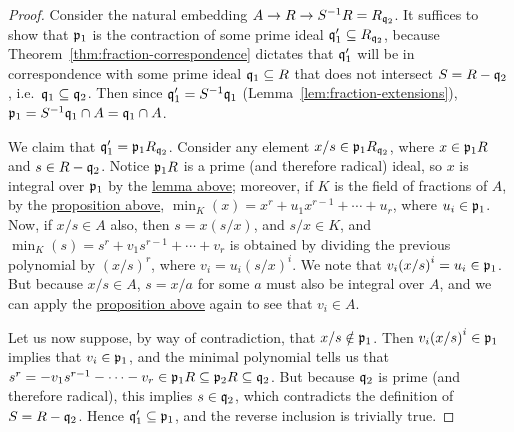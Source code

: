 \begin{proof}
    Consider the natural embedding \(A \to R \to S^{-1}R = R_{\mathfrak{q}_2}\).
    It suffices to show that \(\mathfrak{p}_1\)
    is the contraction of some prime ideal \(\mathfrak{q}_1' \subseteq R_{\mathfrak{q}_2}\),
    because Theorem~\ref{thm:fraction-correspondence} dictates that
    \(\mathfrak{q}_1'\) will be in correspondence with some prime ideal \(\mathfrak{q}_1 \subseteq R\)
    that does not intersect \(S = R - \mathfrak{q}_2\), i.e.\ \(\mathfrak{q}_1 \subseteq \mathfrak{q}_2\).
    Then since \(\mathfrak{q}_1' = S^{-1}\mathfrak{q}_1\) (Lemma~\ref{lem:fraction-extensions}),
    \(\mathfrak{p}_1 = S^{-1}\mathfrak{q}_1 \cap A = \mathfrak{q}_1 \cap A\).

    We claim that \(\mathfrak{q}_1' = \mathfrak{p}_1R_{\mathfrak{q}_2}\).
    Consider any element \(x/s \in \mathfrak{p}_1R_{\mathfrak{q}_2}\),
    where \(x \in \mathfrak{p}_1R\) and \(s \in R - \mathfrak{q}_2\).
    Notice \(\mathfrak{p}_1R\) is a prime (and therefore radical) ideal,
    so \(x\) is integral over \(\mathfrak{p}_1\) by the \hyperref[lem:ideal-integral-closure]{lemma above};
    moreover, if \(K\) is the field of fractions of \(A\),
    by the \hyperref[prop:integral-minimal-polynomial]{proposition above},
    \(\min_K(x) = x^r + u_1 x^{r-1} + \cdots + u_r\), where \(u_i \in \mathfrak{p}_1\).
    Now, if \(x/s \in A\) also, then \(s = x(s/x)\), and \(s/x \in K\),
    and \(\min_K(s) = s^r + v_1 s^{r-1} + \cdots + v_r\) is obtained
    by dividing the previous polynomial by \({(x/s)}^r\), where \(v_i = u_i{(s/x)}^i\).
    We note that \(v_i{(x/s)}^i = u_i \in \mathfrak{p}_1\).
    But because \(x/s \in A\), \(s = x/a\) for some \(a\) must also be integral over \(A\),
    and we can apply the \hyperref[prop:integral-minimal-polynomial]{proposition above} again
    to see that \(v_i \in A\).

    Let us now suppose, by way of contradiction, that \(x/s \notin \mathfrak{p}_1\).
    Then \(v_i{(x/s)}^i \in \mathfrak{p}_1\) implies that \(v_i \in \mathfrak{p}_1\),
    and the minimal polynomial tells us that
    \(s^r = - v_1 s^{r-1} - \cdots - v_r \in \mathfrak{p}_1R \subseteq \mathfrak{p}_2R \subseteq \mathfrak{q}_2\).
    But because \(\mathfrak{q}_2\) is prime (and therefore radical),
    this implies \(s \in \mathfrak{q}_2\), which contradicts the definition of \(S = R - \mathfrak{q}_2\).
    Hence \(\mathfrak{q}_1' \subseteq \mathfrak{p}_1\),
    and the reverse inclusion is trivially true.
\end{proof}

